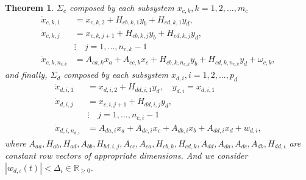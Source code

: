 \documentclass[11pt,letterpaper,twoside,openright]{report}
\newcommand{\RE}{\mathbb{R}}
\newtheorem{theorem}{Theorem}[chapter]
\begin{document}
\begin{theorem}
$\Sigma_c$ composed by each subsystem $x_{c,k}, k=1,2,...,m_c$
\begin{equation}
	\begin{split}\label{ecu: xc}
		\dot{x}_{c,k,1} &= x_{c,k,2} + H_{cb,k,1}y_b + H_{cd,k,1}y_d, \\
		\dot{x}_{c,k,j} &= x_{c,k,j+1} + H_{cb,k,j}y_b + H_{cd,k,j}y_d, \\
		& \vdots \quad j=1,...,n_{c,k}-1\\
		\dot{x}_{c,k,n_{c,k}} &= A_{ca,k}x_a + A_{cc,k}x_c + H_{cb,k,n_{c,k}}y_b + H_{cd,k,n_{c,k}}y_d + \omega_{c,k}, 
	\end{split}
\end{equation}
and finally, $\Sigma_d$ composed by each subsystem $x_{d,i}, i=1,2,...,p_d$
\begin{equation}
	\begin{split}\label{ecu: xd}
		\dot{x}_{d,i,1} &= x_{d,i,2} + H_{dd,i,1}y_d,  \quad y_{d,i} = x_{d,i,1} \\
		\dot{x}_{d,i,j} &= x_{c,i,j+1} + H_{dd,i,j}y_d, \\
		& \vdots \quad j=1,...,n_{c,i}-1\\
		\dot{x}_{d,i,n_{d,i}} &= A_{da,i}x_a + A_{dc,i}x_c + A_{db,i}x_b + A_{dd,i}x_d + w_{d,i}, 
	\end{split}
\end{equation}
where $A_{aa},H_{ab},H_{ad},A_{bb},H_{bd,i,j},A_{cc},A_{ca},H_{cb,k},H_{cd,k},A_{dd},A_{da},A_{dc},A_{db},H_{dd,\iota}$ are constant row vectors of appropriate dimensions. And  we consider $|w_{d,\iota}(t)|< \Delta_{\iota} \in \RE_{\geq 0}$.
\end{theorem}
\end{document}
